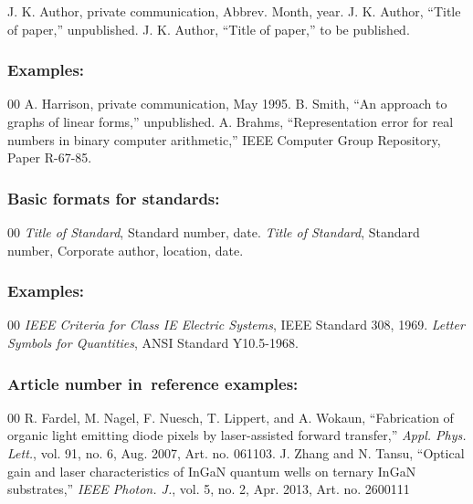\documentclass{IEEEoj}
\begin{document}
\begin{enumerate}
 J. K. Author, private communication, Abbrev. Month, year.
 J. K. Author, ``Title of paper,'' unpublished.
 J. K. Author, ``Title of paper,'' to be published.
\end{enumerate}

\subsubsection*{Examples:}

\begin{thebibliography}{00}
 A. Harrison, private communication, May 1995.
 B. Smith, ``An approach to graphs of linear forms,'' unpublished.
 A. Brahms, ``Representation error for real numbers in binary computer arithmetic,'' IEEE Computer Group Repository, Paper R-67-85.
\end{thebibliography}

\subsubsection*{Basic formats for standards:}

\begin{thebibliography}{00}
 \textit{Title of Standard}, Standard number, date.
 \textit{Title of Standard}, Standard number, Corporate author, location, date.
\end{thebibliography}

\subsubsection*{Examples:}

\begin{thebibliography}{00}
 \emph{IEEE Criteria for Class IE Electric Systems}, IEEE Standard 308, 1969.
 \emph{Letter Symbols for Quantities}, ANSI Standard Y10.5-1968.
\end{thebibliography}

\subsubsection*{Article number in~reference examples:}

\begin{thebibliography}{00}
 R. Fardel, M. Nagel, F. Nuesch, T. Lippert, and A. Wokaun, ``Fabrication of organic light emitting diode pixels by laser-assisted forward transfer,'' \textit{Appl. Phys. Lett.}, vol. 91, no. 6, Aug. 2007, Art. no. 061103.
 J. Zhang and N. Tansu, ``Optical gain and laser characteristics of InGaN quantum wells on ternary InGaN substrates,'' \textit{IEEE Photon. J.}, vol. 5, no. 2, Apr. 2013, Art. no. 2600111
\end{thebibliography}
\end{document}
